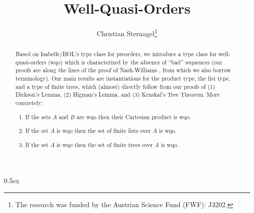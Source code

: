 \documentclass[11pt,a4paper]{article}
\begin{document}
\title{Well-Quasi-Orders}
\author{Christian Sternagel\thanks{%
  The research was funded by the Austrian Science Fund (FWF): J3202.}}
\maketitle

\begin{abstract}
Based on Isabelle/HOL's type class for preorders, we introduce a type class for
well-quasi-orders (wqo) which is characterized by the absence of ``bad''
sequences (our proofs are along the lines of the proof of Nash-Williams
\cite{N1963}, from which we also borrow terminology).  Our main results are
instantiations for the product type, the list type, and a type of finite trees,
which (almost) directly follow from our proofs of (1) Dickson's Lemma, (2)
Higman's Lemma, and (3) Kruskal's Tree Theorem. More concretely:
\begin{enumerate}
\item If the sets $A$ and $B$ are wqo then their Cartesian product is wqo.
\item If the set $A$ is wqo then the set of finite lists over $A$ is wqo.
\item If the set $A$ is wqo then the set of finite trees over $A$ is wqo.
\end{enumerate}
\end{abstract}

\tableofcontents


\parindent 0pt\parskip 0.5ex





\end{document}
